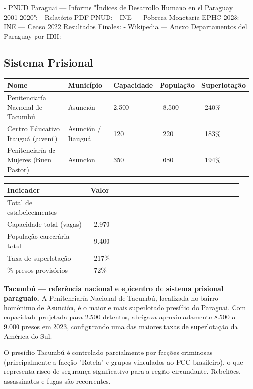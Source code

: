 - PNUD Paraguai --- Informe "Índices de Desarrollo Humano en el Paraguay 2001-2020": 
- Relatório PDF PNUD: 
- INE --- Pobreza Monetaria EPHC 2023: 
- INE --- Censo 2022 Resultados Finales: 
- Wikipedia --- Anexo Departamentos del Paraguay por IDH: 


\subsection{Sistema Prisional}



{\small
\setlength{\tabcolsep}{3pt}
\renewcommand{\arraystretch}{1.12}
{\small
\begin{tabularx}{\linewidth}{lXXXX}
\toprule
Nome & Município & Capacidade & População & Superlotação \\
\midrule
Penitenciaría Nacional de Tacumbú & Asunción & 2.500 & ~8.500 & ~240\% \\
Centro Educativo Itauguá (juvenil) & Asunción / Itauguá & 120 & ~220 & ~183\% \\
Penitenciaría de Mujeres (Buen Pastor) & Asunción & 350 & ~680 & ~194\% \\
\bottomrule
\end{tabularx}
}
}


{\small
\setlength{\tabcolsep}{3pt}
\renewcommand{\arraystretch}{1.12}
\begin{tabularx}{\linewidth}{>{\raggedright\arraybackslash}p{0.34\linewidth} >{\raggedright\arraybackslash}p{0.62\linewidth}}
\toprule
Indicador & Valor \\
\midrule
Total de estabelecimentos & 3 \\
Capacidade total (vagas) & ~2.970 \\
População carcerária total & ~9.400 \\
Taxa de superlotação & ~217\% \\
\% presos provisórios & ~72\% \\
\bottomrule
\end{tabularx}
}


\textbf{Tacumbú --- referência nacional e epicentro do sistema prisional paraguaio.} A Penitenciaría Nacional de Tacumbú, localizada no bairro homônimo de Asunción, é o maior e mais superlotado presídio do Paraguai. Com capacidade projetada para 2.500 detentos, abrigava aproximadamente 8.500 a 9.000 presos em 2023, configurando uma das maiores taxas de superlotação da América do Sul.

O presídio Tacumbú é controlado parcialmente por facções criminosas (principalmente a facção "Rotela" e grupos vinculados ao PCC brasileiro), o que representa risco de segurança significativo para a região circundante. Rebeliões, assassinatos e fugas são recorrentes.


